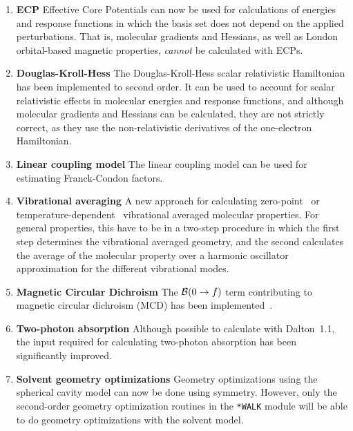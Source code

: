 \begin{enumerate}
\item {\bf ECP} Effective Core Potentials can now be used for calculations
of energies and response functions in which the basis set does not
depend on the applied perturbations. That is, molecular gradients and
Hessians, as well as London orbital-based magnetic properties, {\em cannot}
be calculated with ECPs.

\item {\bf Douglas-Kroll-Hess} The Douglas-Kroll-Hess scalar relativistic Hamiltonian
has been implemented to second order. It can be used to account for
scalar relativistic effects in molecular energies and response
functions, and although molecular gradients and Hessians can be
calculated, they are not strictly correct, as they use the
non-relativistic derivatives of the one-electron Hamiltonian.

\item {\bf Linear coupling model} The linear coupling model can be used for
estimating Franck-Condon factors.

\item  {\bf Vibrational averaging} A new approach for calculating
zero-point~\cite{poakrprtjcp112,krpoaprtjcp112} or
tem\-pera\-ture-dependent~\cite{krjljv} vibrational averaged molecular
properties. For general properties, this have to be in a two-step
procedure in which the first step determines the vibrational averaged
geometry, and the second calculates the average of the molecular
property over a harmonic oscillator approximation for the different
vibrational modes.

\item {\bf Magnetic Circular Dichroism} The ${\cal{B}}(0\rightarrow f)$ term
contributing to
magnetic circular dichroism (MCD) has been
implemented~\cite{Coriani:MCDRSP}.

\item {\bf Two-photon absorption} Although possible to calculate with
Dalton~1.1, the input required for calculating two-photon absorption
has been significantly improved.

\item{\bf Solvent geometry optimizations} Geometry optimizations using
the spherical cavity model can now be done using symmetry. However,
only the second-order geometry optimization routines in the
\verb|*WALK| module will be able to do geometry optimizations with the
solvent model.



\end{enumerate}
